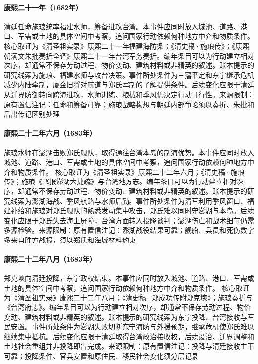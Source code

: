 \hypertarget{civic:EQ-1682-SHI-LANG}{}\paragraph{康熙二十一年（1682年）}清廷任命施琅统率福建水师，筹备进攻台湾。本事件应同时放入城池、道路、港口、军需或土地的具体空间中考察，追问国家行动依赖何种地方中介和物质条件。 核心取证为《清圣祖实录》康熙二十一年福建海防条；《清史稿·施琅传》；《康熙朝满文朱批奏折全译》康熙二十一年台湾军务奏折。编年条目可以为行动建立相对次序，却通常不保存劳动过程、物价变动、建筑材料或非精英的叙述。账本提示的研究线索为施琅、福建水师与攻台决策。事件所处条件为三藩平定和东宁继承危机减少内陆牵制，厦金旧将对航道与郑氏军制的了解提供条件。后续变化应限于清廷从迁界防御转向跨海进攻，水师训练、粮械和季风仍决定行动可行性。来源限制：原有置信注记：任命和筹备可靠；施琅战略构想与朝廷内部争论须以奏折、朱批和后出传记区别处理
\hypertarget{civic:EQ-1683-PENGHU}{}\paragraph{康熙二十二年六月（1683年）}施琅水师在澎湖击败郑氏舰队，取得通往台湾本岛的制海优势。本事件应同时放入城池、道路、港口、军需或土地的具体空间中考察，追问国家行动依赖何种地方中介和物质条件。 核心取证为《清圣祖实录》康熙二十二年六月；《清史稿·施琅传》；施琅《飞报澎湖大捷疏》与台湾地方志。编年条目可以为行动建立相对次序，却通常不保存劳动过程、物价变动、建筑材料或非精英的叙述。账本提示的研究线索为澎湖海战、季风航路与水师后勤。事件所处条件为清军利用季风窗口、福建补给和施琅对郑氏舰队的熟悉发动集中攻击，郑氏难以同时守澎湖与本岛。后续变化应限于郑氏失去海上屏障，台湾方面转入投降谈判；澎湖伤亡和战术细节仍需多源检验。来源限制：原有置信注记：澎湖战役结果可靠；舰船、兵员和死伤数字多来自胜方战报，须以郑氏和海域材料约束
\hypertarget{civic:EQ-1683-TAIWAN-SURRENDER}{}\paragraph{康熙二十二年八月（1683年）}郑克塽向清廷投降，东宁政权结束。本事件应同时放入城池、道路、港口、军需或土地的具体空间中考察，追问国家行动依赖何种地方中介和物质条件。 核心取证为《清圣祖实录》康熙二十二年八月；《清史稿·郑成功传附郑克塽》；施琅奏折与《台湾府志》。编年条目可以为行动建立相对次序，却通常不保存劳动过程、物价变动、建筑材料或非精英的叙述。账本提示的研究线索为东宁投降、台湾接收与军民安置。事件所处条件为澎湖失败切断东宁海防与外援预期，继承危机使郑氏难以继续集中抵抗。后续变化应限于清廷取得台湾政治接收权，后续设治、迁界调整和土地社会重组并非投降即告完成。来源限制：原有置信注记：投降与清廷接收主干可靠；投降条件、官兵安置和原住民、移民社会变化须分层记录

